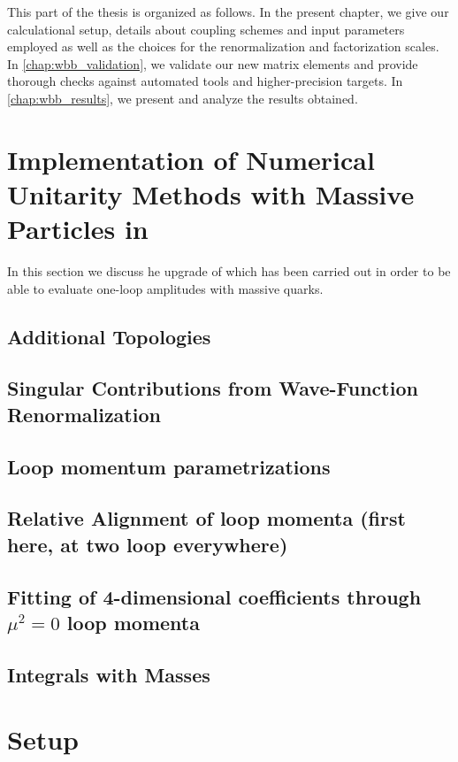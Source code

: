 This part of the thesis is organized as follows. In the present chapter, we give
our calculational setup, details about coupling
schemes and input parameters employed as well as the choices for the renormalization and
factorization scales. In
\cref{chap:wbb_validation}, we validate our new matrix elements
and provide thorough checks against automated tools and
higher-precision targets. In \cref{chap:wbb_results}, we
present and analyze the results obtained.



\section{Implementation of Numerical Unitarity Methods with Massive Particles in \BlackHat{}}
\label{sec:BHMassiveImpl}
In this section we discuss he upgrade of \BlackHat{} which has been carried out in order to be able
to evaluate one-loop amplitudes with massive quarks.
\subsection{Additional Topologies}
\subsection{Singular Contributions from Wave-Function Renormalization}
\subsection{Loop momentum parametrizations}
\subsection{Relative Alignment of loop momenta (first here, at two loop everywhere)}
\subsection{Fitting of 4-dimensional coefficients through $\mu^2=0$ loop momenta}
\subsection{Integrals with Masses}



\section{Setup}

